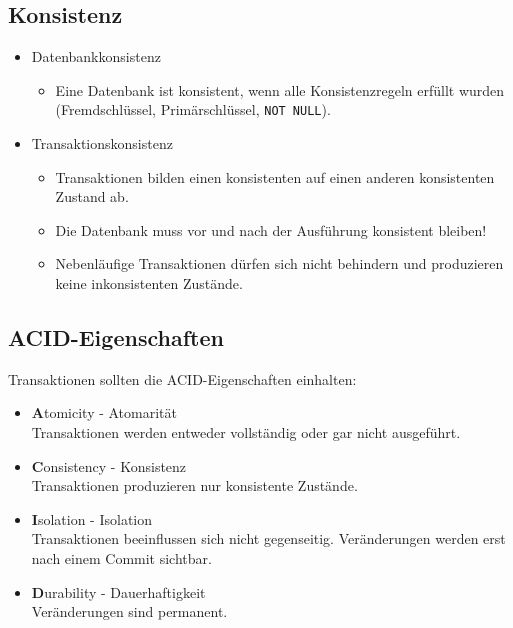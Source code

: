 \documentclass[a4paper, 11pt, accentcolor = tud3b]{tudreport}
\begin{document}
            \subsection{Konsistenz} %
                \begin{itemize}
                	\item Datenbankkonsistenz
                		\begin{itemize}
                			\item Eine Datenbank ist konsistent, wenn alle Konsistenzregeln erfüllt wurden (Fremdschlüssel, Primärschlüssel, \lstinline|NOT NULL|).
                		\end{itemize}
                	\item Transaktionskonsistenz
                		\begin{itemize}
                			\item Transaktionen bilden einen konsistenten auf einen anderen konsistenten Zustand ab.
                			\item Die Datenbank muss vor und nach der Ausführung konsistent bleiben!
                			\item Nebenläufige Transaktionen dürfen sich nicht behindern und produzieren keine inkonsistenten Zustände.
                		\end{itemize}
                \end{itemize}

            \subsection{ACID-Eigenschaften} %
                Transaktionen sollten die ACID-Eigenschaften einhalten:
                \begin{itemize}
                	\item \textbf{A}tomicity - Atomarität \\ Transaktionen werden entweder vollständig oder gar nicht ausgeführt.
                	\item \textbf{C}onsistency - Konsistenz \\ Transaktionen produzieren nur konsistente Zustände.
                	\item \textbf{I}solation - Isolation \\ Transaktionen beeinflussen sich nicht gegenseitig. Veränderungen werden erst nach einem Commit sichtbar.
                	\item \textbf{D}urability - Dauerhaftigkeit \\ Veränderungen sind permanent.
                \end{itemize}
\end{document}
